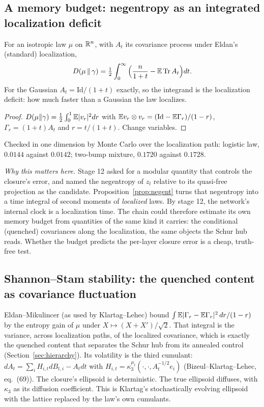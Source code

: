 \label{sec:heat}
\subsection{A memory budget: negentropy as an integrated localization deficit}
\begin{proposition}\label{prop:negent}
For an isotropic law $\mu$ on $\mathbb R^n$, with $A_t$ its covariance process under Eldan's (standard) localization,
\[
D(\mu\,\|\,\gamma)=\tfrac12\int_0^\infty\Big(\frac n{1+t}-\mathbb E\operatorname{Tr} A_t\Big)dt .
\]
For the Gaussian $A_t=\mathrm{Id}/(1+t)$ exactly, so the integrand is the localization deficit: how much faster than a Gaussian the
law localizes.
\end{proposition}
\begin{proof}
$D(\mu\|\gamma)=\frac12\int_0^1\mathbb E|v_r|^2dr$ with $\mathbb E v_r\otimes v_r=(\mathrm{Id}-\mathbb E\Gamma_r)/(1-r)$, $\Gamma_r=(1+t)A_t$ and $r=t/(1+t)$. Change variables.
\end{proof}
Checked in one dimension by Monte Carlo over the localization path: logistic law, $0.0144$ against $0.0142$; two-bump mixture,
$0.1720$ against $0.1728$.

\emph{Why this matters here.} Stage 12 asked for a modular quantity that controls the closure's error, and named the negentropy
of $z_l$ relative to its quasi-free projection as the candidate. Proposition~\ref{prop:negent} turns that negentropy into a time integral of
second moments of \emph{localized} laws. By stage 12, the network's internal clock is a localization time. The chain could therefore
estimate its own memory budget from quantities of the same kind it carries: the conditional (quenched) covariances along the
localization, the same objects the Schur hub reads. Whether the budget predicts the per-layer closure error is a cheap, truth-free
test.

\subsection{Shannon--Stam stability: the quenched content as covariance fluctuation}
Eldan--Mikulincer (as used by Klartag--Lehec) bound $\int\mathbb E|\Gamma_r-\mathbb E\Gamma_r|^2\,dr/(1-r)$ by the entropy gain of $\mu$ under
$X\mapsto(X+X')/\sqrt2$. That integral is the variance, across localization paths, of the localized covariance, which is exactly the
quenched content that separates the Schur hub from its annealed control (Section~\ref{sec:hierarchy}). Its volatility is the third cumulant:
$dA_t=\sum_iH_{i,t}dB_{t,i}-A_tdt$ with $H_{i,t}=\kappa_3^{\mu_t}(\cdot,\cdot,A_t^{-1/2}e_i)$ (Bizeul--Klartag--Lehec, eq.~(69)). The closure's
ellipsoid is deterministic. The true ellipsoid diffuses, with $\kappa_3$ as its diffusion coefficient. This is Klartag's
stochastically evolving ellipsoid with the lattice replaced by the law's own cumulants.

